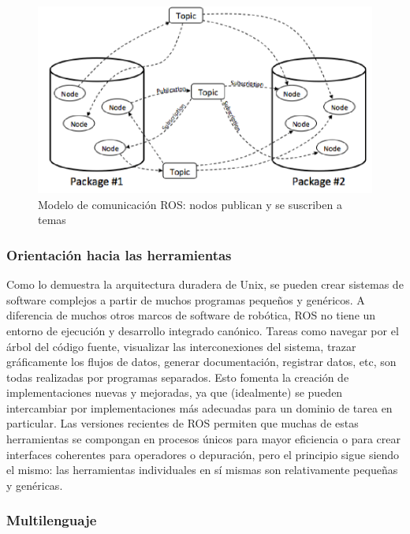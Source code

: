            \begin{figure}[htb]
                \centering
                \includegraphics[width=0.8\linewidth]{Main/Chapter3/Images3/arquitectura_por_nodos_1.png}
                \caption{Modelo de comunicación ROS: nodos publican y se suscriben a temas \cite{naval_delta}}
                \label{f:Cap3-5_arquitectura_ros}
            \end{figure}
            
        \subsubsection{Orientación hacia las herramientas}
        
            Como lo demuestra la arquitectura duradera de Unix, se pueden crear sistemas de software complejos a partir de muchos programas pequeños y genéricos. A diferencia de muchos otros marcos de software de robótica, ROS no tiene un entorno de ejecución y desarrollo integrado canónico. Tareas como navegar por el árbol del código fuente, visualizar las interconexiones del sistema, trazar gráficamente los flujos de datos, generar documentación, registrar datos, etc, son todas realizadas por programas separados. Esto fomenta la creación de implementaciones nuevas y mejoradas, ya que (idealmente) se pueden intercambiar por implementaciones más adecuadas para un dominio de tarea en particular. Las versiones recientes de ROS permiten que muchas de estas herramientas se compongan en procesos únicos para mayor eficiencia o para crear interfaces coherentes para operadores o depuración, pero el principio sigue siendo el mismo: las herramientas individuales en sí mismas son relativamente pequeñas y genéricas.
            
        \subsubsection{Multilenguaje}
        
